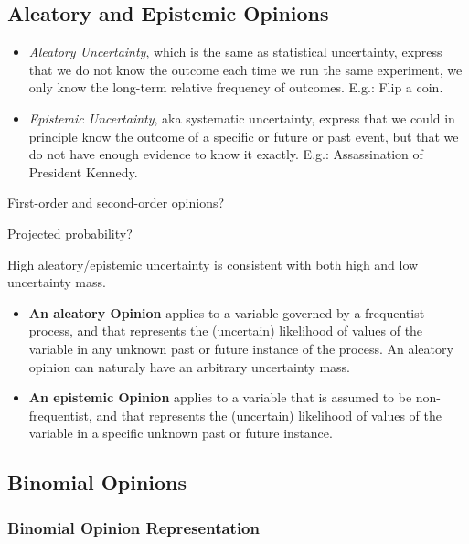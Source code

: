 \subsection{Aleatory and Epistemic Opinions}

\begin{itemize}
	\item \emph{Aleatory Uncertainty}, which is the same as statistical uncertainty, express that we do not know the outcome each time we run the same experiment, we only know the long-term relative frequency of outcomes. E.g.: Flip a coin.
	\item \emph{Epistemic Uncertainty}, aka systematic uncertainty, express that we could in principle know the outcome of a specific or future or past event, but that we do not have enough evidence to know it exactly. E.g.: Assassination of President Kennedy.
\end{itemize}

\begin{question}
	First-order and second-order opinions?
\end{question}

\begin{question}
	Projected probability?
\end{question}

High aleatory/epistemic uncertainty is consistent with both high and low uncertainty mass.

\begin{itemize}
	\item \textbf{An aleatory Opinion} applies to a variable governed by a frequentist process, and that represents the (uncertain) likelihood of values of the variable in any unknown past or future instance of the process. An aleatory opinion can naturaly have an arbitrary uncertainty mass.
	\item \textbf{An epistemic Opinion} applies to a variable that is assumed to be non-frequentist, and that represents the (uncertain) likelihood of values of the variable in a specific unknown past or future instance.
\end{itemize}

\subsection{Binomial Opinions}

\subsubsection{Binomial Opinion Representation}

